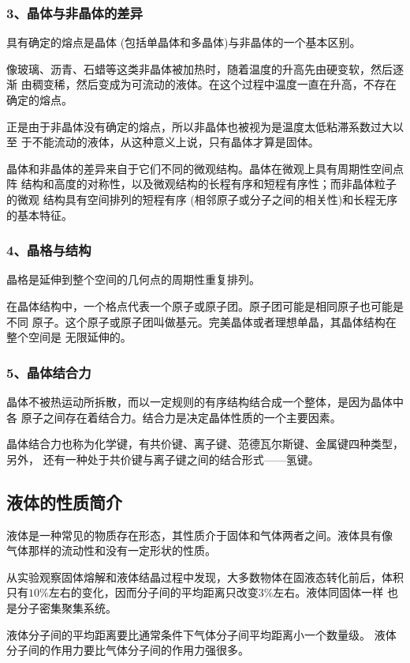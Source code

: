 \subsubsection*{3、晶体与非晶体的差异}
\begin{theorem}
    具有确定的熔点是晶体 (包括单晶体和多晶体)与非晶体的一个基本区别。
\end{theorem}

像玻璃、沥青、石蜡等这类非晶体被加热时，随着温度的升高先由硬变软，然后逐渐
由稠变稀，然后变成为可流动的液体。在这个过程中温度一直在升高，不存在确定的熔点。

正是由于非晶体没有确定的熔点，所以非晶体也被视为是温度太低粘滞系数过大以至
于不能流动的液体，从这种意义上说，只有晶体才算是固体。

晶体和非晶体的差异来自于它们不同的微观结构。晶体在微观上具有周期性空间点阵
结构和高度的对称性，以及微观结构的长程有序和短程有序性；而非晶体粒子的微观
结构具有空间排列的短程有序 (相邻原子或分子之间的相关性)和长程无序的基本特征。
\subsubsection*{4、晶格与结构}
晶格是延伸到整个空间的几何点的周期性重复排列。

在晶体结构中，一个格点代表一个原子或原子团。原子团可能是相同原子也可能是不同
原子。这个原子或原子团叫做基元。完美晶体或者理想单晶，其晶体结构在整个空间是
无限延伸的。
\subsubsection*{5、晶体结合力}
晶体不被热运动所拆散，而以一定规则的有序结构结合成一个整体，是因为晶体中各
原子之间存在着结合力。结合力是决定晶体性质的一个主要因素。

晶体结合力也称为化学键，有共价键、离子键、范德瓦尔斯键、金属键四种类型，
另外， 还有一种处于共价键与离子键之间的结合形式——氢键。
\subsection{液体的性质简介}
液体是一种常见的物质存在形态，其性质介于固体和气体两者之间。液体具有像
气体那样的流动性和没有一定形状的性质。

从实验观察固体熔解和液体结晶过程中发现，大多数物体在固液态转化前后，体积 
只有$10\%$左右的变化，因而分子间的平均距离只改变$3\%$左右。液体同固体一样
也是分子密集聚集系统。

液体分子间的平均距离要比通常条件下气体分子间平均距离小一个数量级。
液体分子间的作用力要比气体分子间的作用力强很多。

